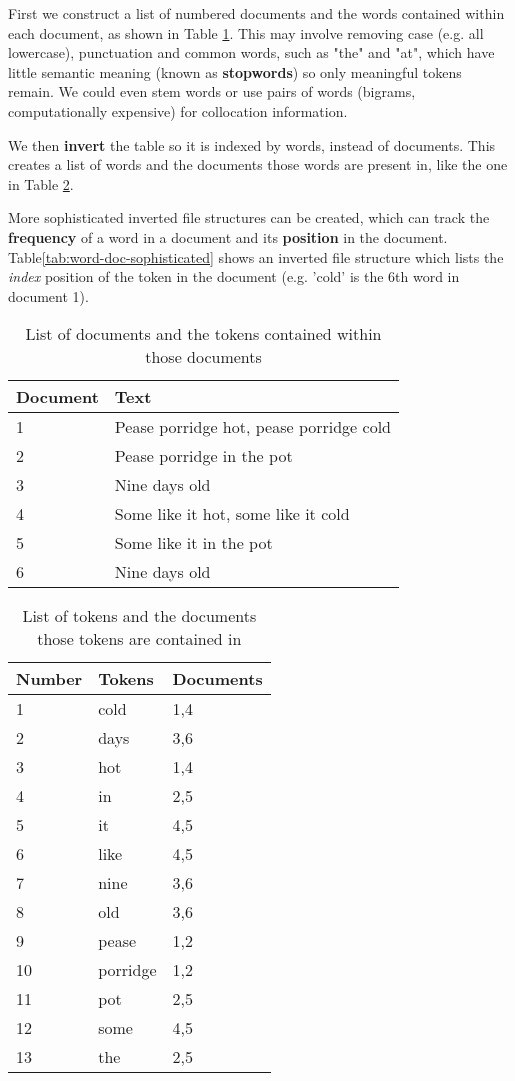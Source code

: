 \documentclass{article}
\begin{document}
First we construct a list of numbered documents and the words contained within each document, as shown in Table \ref{tab:doc-word}. This may involve removing case (e.g. all lowercase), punctuation and common words, such as "the" and "at", which have little semantic meaning (known as \textbf{stopwords}) so only meaningful tokens remain. We could even stem words or use pairs of words (bigrams, computationally expensive) for collocation information.

We then \textbf{invert} the table so it is indexed by words, instead of documents. This creates a list of words and the documents those words are present in, like the one in Table \ref{tab:word-doc}.

More sophisticated inverted file structures can be created, which can track the \textbf{frequency} of a word in a document and its \textbf{position} in the document. Table\ref{tab:word-doc-sophisticated} shows an inverted file structure which lists the \textit{index} position of the token in the document (e.g. 'cold' is the 6th word in document 1).

\begin{table}
	\centering
	\begin{tabular}{|l|l|}
		\hline
		\textbf{Document} & \textbf{Text} \\
		\hline		
		1 & Pease porridge hot, pease porridge cold \\
		2 & Pease porridge in the pot \\
		3 & Nine days old \\
		4 & Some like it hot, some like it cold \\
		5 & Some like it in the pot \\
		6 & Nine days old \\
		\hline				
	\end{tabular}
	\caption{List of documents and the tokens contained within those documents}
	\label{tab:doc-word}
\end{table}

\begin{table}
	\centering
	\begin{tabular}{|l|l|l|}
		\hline
		\textbf{Number} & \textbf{Tokens} & \textbf{Documents} \\
		\hline
		1 & cold & 1,4 \\
		2 & days & 3,6 \\
		3 & hot & 1,4 \\
		4 & in & 2,5 \\
		5 & it & 4,5 \\
		6 & like & 4,5 \\
		7 & nine & 3,6 \\
		8 & old & 3,6 \\
		9 & pease & 1,2 \\
		10 & porridge & 1,2 \\		
		11 & pot & 2,5 \\
		12 & some & 4,5 \\
		13 & the & 2,5 \\		
		\hline
	\end{tabular}
	\caption{List of tokens and the documents those tokens are contained in}
	\label{tab:word-doc}
\end{table}
\end{document}
